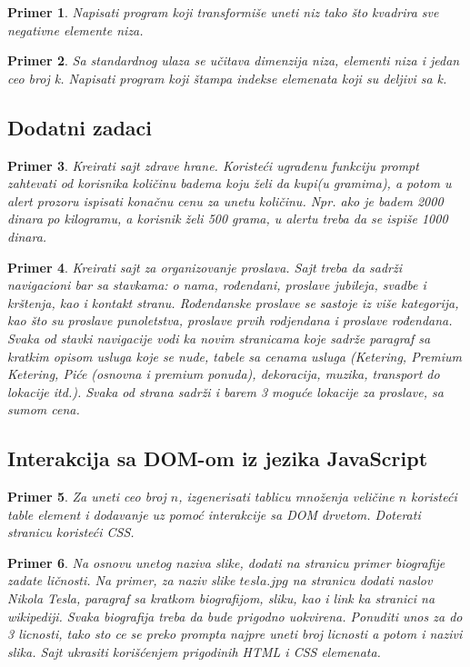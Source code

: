 \documentclass[a4paper]{article}
\newtheorem{primer}{Primer}[section]
\begin{document}
\begin{primer}
Napisati program koji transformiše uneti niz tako što
kvadrira sve negativne elemente niza. 
\end{primer}

\begin{primer}
Sa standardnog ulaza se učitava dimenzija niza, elementi
niza i jedan ceo broj k. Napisati program koji štampa indekse elemenata koji su
deljivi sa k.
\end{primer}




\subsection{Dodatni zadaci}
\begin{primer}
Kreirati sajt zdrave hrane. Koristeći ugrađenu funkciju prompt zahtevati od korisnika količinu badema koju želi da kupi(u gramima), a potom u alert prozoru ispisati konačnu cenu za unetu količinu. Npr. ako je badem 2000 dinara po kilogramu, a korisnik želi 500 grama, u alertu treba da se ispiše 1000 dinara.  
\end{primer}


\begin{primer}
Kreirati sajt za organizovanje proslava. Sajt treba da sadrži navigacioni bar sa stavkama: o nama, rođendani, proslave jubileja, svadbe i krštenja, kao i kontakt stranu. Rođendanske proslave se sastoje iz više kategorija, kao što su proslave punoletstva, proslave prvih rodjendana i proslave rođendana. Svaka od stavki navigacije vodi ka novim stranicama koje sadrže paragraf sa kratkim opisom usluga koje se nude, tabele sa cenama usluga (Ketering, Premium Ketering, Piće (osnovna i premium ponuda), dekoracija, muzika, transport do lokacije itd.). Svaka od strana sadrži i barem 3 moguće lokacije za proslave, sa sumom cena.

\end{primer}

\subsection{Interakcija sa DOM-om iz jezika JavaScript}
\begin{primer}
Za uneti ceo broj $n$, izgenerisati tablicu množenja veličine $n$ koristeći table element i dodavanje uz pomoć interakcije sa DOM drvetom. Doterati stranicu koristeći CSS.
\end{primer}

\begin{primer}
Na osnovu unetog naziva slike, dodati na stranicu primer biografije zadate ličnosti. Na primer, za naziv slike $tesla.jpg$ na stranicu dodati naslov Nikola Tesla, paragraf sa kratkom biografijom, sliku, kao i link ka stranici na wikipediji. Svaka biografija treba da bude prigodno uokvirena. Ponuditi unos za do 3 licnosti, tako sto ce se preko prompta najpre uneti broj licnosti a potom i nazivi slika. Sajt ukrasiti korišćenjem prigodinih HTML i CSS elemenata.
\end{primer}
\end{document}

